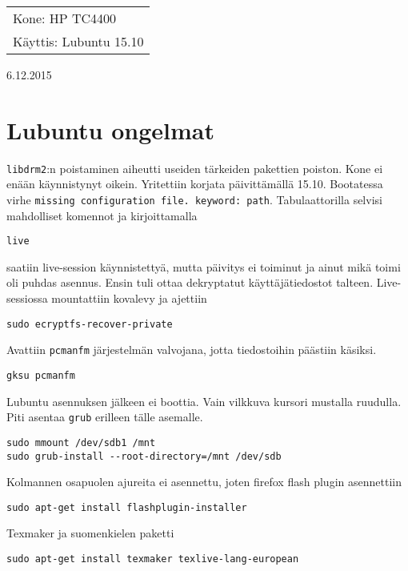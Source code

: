 \documentclass[main.tex]{subfiles}
\begin{document}
\thispagestyle{empty}
\begin{tabular}[t]{l}
Kone: HP TC4400\\
Käyttis: Lubuntu 15.10
\end{tabular}
\hfill 6.12.2015

{\section{Lubuntu ongelmat}}

\texttt{libdrm2}:n poistaminen aiheutti useiden tärkeiden pakettien poiston. Kone ei enään käynnistynyt oikein. Yritettiin korjata päivittämällä 15.10. Bootatessa virhe \texttt{missing configuration file. keyword: path}. Tabulaattorilla selvisi mahdolliset komennot ja kirjoittamalla 

\begin{lstlisting}
live
\end{lstlisting}

saatiin live-session käynnistettyä, mutta päivitys ei toiminut ja ainut mikä toimi oli puhdas asennus. Ensin tuli ottaa dekryptatut käyttäjätiedostot talteen. Live-sessiossa mountattiin kovalevy ja ajettiin

\begin{lstlisting}
sudo ecryptfs-recover-private
\end{lstlisting}

Avattiin \texttt{pcmanfm} järjestelmän valvojana, jotta tiedostoihin päästiin käsiksi.

\begin{lstlisting}
gksu pcmanfm
\end{lstlisting}

Lubuntu asennuksen jälkeen ei boottia. Vain vilkkuva kursori mustalla ruudulla. Piti asentaa \texttt{grub} erilleen tälle asemalle.

\begin{lstlisting}
sudo mmount /dev/sdb1 /mnt
sudo grub-install --root-directory=/mnt /dev/sdb
\end{lstlisting}

Kolmannen osapuolen ajureita ei asennettu, joten firefox flash plugin asennettiin

\begin{lstlisting}
sudo apt-get install flashplugin-installer 
\end{lstlisting}

Texmaker ja suomenkielen paketti

\begin{lstlisting}
sudo apt-get install texmaker texlive-lang-european
\end{lstlisting}
\end{document}
